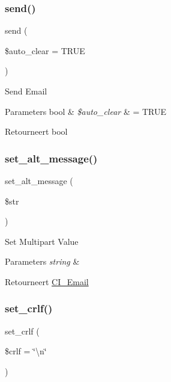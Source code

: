 \subsubsection{\texorpdfstring{send()}{send()}}
{\footnotesize\ttfamily send (\begin{DoxyParamCaption}\item[{}]{\$auto\+\_\+clear = {\ttfamily TRUE} }\end{DoxyParamCaption})}

Send Email


\begin{DoxyParams}[1]{Parameters}
bool & {\em \$auto\+\_\+clear} & = T\+R\+UE \\
\hline
\end{DoxyParams}
\begin{DoxyReturn}{Retourneert}
bool 
\end{DoxyReturn}
\mbox{\label{class_c_i___email_a18f0b650e6e9a859e1936a41e86fb3a6}} 
\subsubsection{\texorpdfstring{set\_alt\_message()}{set\_alt\_message()}}
{\footnotesize\ttfamily set\+\_\+alt\+\_\+message (\begin{DoxyParamCaption}\item[{}]{\$str }\end{DoxyParamCaption})}

Set Multipart Value


\begin{DoxyParams}{Parameters}
{\em string} & \\
\hline
\end{DoxyParams}
\begin{DoxyReturn}{Retourneert}
\mbox{\hyperlink{class_c_i___email}{C\+I\+\_\+\+Email}} 
\end{DoxyReturn}
\mbox{\label{class_c_i___email_a8bfdf8b14a9dcf4ee18b52c0a2afa833}} 
\subsubsection{\texorpdfstring{set\_crlf()}{set\_crlf()}}
{\footnotesize\ttfamily set\+\_\+crlf (\begin{DoxyParamCaption}\item[{}]{\$crlf = {\ttfamily \char`\"{}\textbackslash{}n\char`\"{}} }\end{DoxyParamCaption})}

